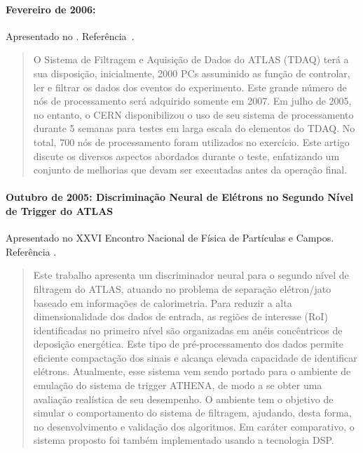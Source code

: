 \paragraph{Fevereiro de 2006: }
Apresentado no . Referência~\cite{aa:chep-06-01}.

\begin{quotation}
O Sistema de Filtragem e Aquisição de Dados do ATLAS (TDAQ) terá a sua
disposição, inicialmente, 2000 PCs assuminido as função de controlar, ler e
filtrar os dados dos eventos do experimento. Este grande número de nós de
processamento será adquirido somente em 2007. Em julho de 2005, no entanto, o
CERN disponibilizou o uso de seu sistema de processamento  durante
5 semanas para testes em larga escala do elementos do TDAQ. No total, 700 nós
de processamento foram utilizados no exercício. Este artigo discute os
diversos aspectos abordados durante o teste, enfatizando um conjunto de
melhorias que devam ser executadas antes da operação final.
\end{quotation}

\paragraph{Outubro de 2005: Discriminação Neural de Elétrons no Segundo Nível
de Trigger do ATLAS} Apresentado no XXVI Encontro Nacional de Física de
Partículas e Campos. Referência \cite{aa:enfpc-05a}. 

\begin{quotation}
Este trabalho apresenta um discriminador neural para o segundo nível de
filtragem do ATLAS, atuando no problema de separação elétron/jato baseado em
informações de calorimetria. Para reduzir a alta dimensionalidade dos dados de
entrada, as regiões de interesse (RoI) identificadas no primeiro nível são
organizadas em anéis concêntricos de deposição energética. Este tipo de
pré-processamento dos dados permite eficiente compactação dos sinais e alcança
elevada capacidade de identificar elétrons. Atualmente, esse sistema vem sendo
portado para o ambiente de emulação do sistema de trigger ATHENA, de modo a se
obter uma avaliação realística de seu desempenho. O ambiente tem o objetivo de
simular o comportamento do sistema de filtragem, ajudando, desta forma, no
desenvolvimento e validação dos algoritmos. Em caráter comparativo, o sistema
proposto foi também implementado usando a tecnologia DSP.
\end{quotation}

